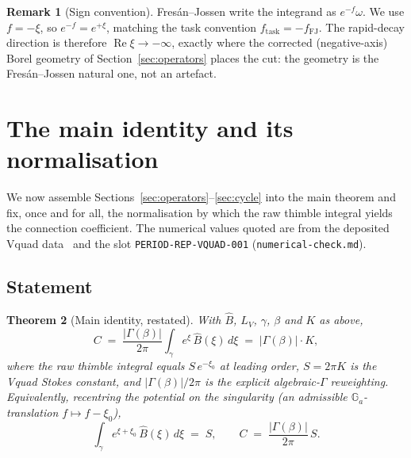 \documentclass[11pt,reqno]{amsart}
\renewcommand{\_}{\vquadorigunderscore\allowbreak}
\theoremstyle{plain}
\newtheorem{theorem}{Theorem}[section]
\theoremstyle{definition}
\newtheorem{remark}[theorem]{Remark}
\newcommand{\Bhat}{\widehat{B}}
\newcommand{\LV}{L_{V}}
\newcommand{\xizero}{\xi_0}
\providecommand{\C}{}\renewcommand{\C}{C}
\begin{document}
\begin{remark}[Sign convention]\label{rmk:fjsign}
Fres\'an--Jossen write the integrand as $e^{-f}\omega$. We use $f=-\xi$, so $e^{-f}=e^{+\xi}$,
matching the task convention $f_{\mathrm{task}}=-f_{\mathrm{FJ}}$. The rapid-decay direction is
therefore $\operatorname{Re}\xi\to-\infty$, exactly where the corrected (negative-axis) Borel
geometry of Section~\ref{sec:operators} places the cut: the geometry is the Fres\'an--Jossen
natural one, not an artefact.
\end{remark}

\section{The main identity and its normalisation}\label{sec:main}

We now assemble Sections~\ref{sec:operators}--\ref{sec:cycle} into the main theorem and fix, once
and for all, the normalisation by which the raw thimble integral yields the connection
coefficient. The numerical values quoted are from the deposited V\_quad data~\cite{Vquad,StokesNote}
and the slot \texttt{PERIOD-REP-VQUAD-001} (\texttt{numerical-check.md}).

\subsection{Statement}
\begin{theorem}[Main identity, restated]\label{thm:main-restated}
With $\Bhat$, $\LV$, $\gamma$, $\beta$ and $K$ as above,
\begin{equation}\label{eq:main-again}
  \C\;=\;\frac{\lvert\Gamma(\beta)\rvert}{2\pi}\int_{\gamma}e^{\xi}\,\Bhat(\xi)\,d\xi
  \;=\;\lvert\Gamma(\beta)\rvert\cdot K ,
\end{equation}
where the raw thimble integral equals $S\,e^{-\xizero}$ at leading order, $S=2\pi K$ is the
V\_quad Stokes constant, and $\lvert\Gamma(\beta)\rvert/2\pi$ is the explicit algebraic-$\Gamma$
reweighting. Equivalently, recentring the potential on the singularity
(an admissible $\mathbb{G}_a$-translation $f\mapsto f-\xizero$),
\begin{equation}\label{eq:main-recentred}
  \int_\gamma e^{\xi+\xizero}\,\Bhat(\xi)\,d\xi\;=\;S,\qquad
  \C\;=\;\frac{\lvert\Gamma(\beta)\rvert}{2\pi}\,S .
\end{equation}
\end{theorem}
\end{document}
